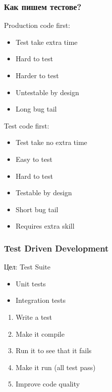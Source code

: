 
\begin{frame}
  \frametitle{Как пишем тестове?}
  \begin{minipage}[t]{0.48\linewidth}
  \pause
  Production code first:\pause
  \begin{itemize}
     \item Test take extra time\pause
     \item Hard to test\pause
     \item Harder to test\pause
     \item Untestable by design\pause
     \item Long bug tail\pause
  \end{itemize}
  \end{minipage}\hfill
  \begin{minipage}[t]{0.48\linewidth}
  Test code first:\pause
  \begin{itemize}
     \item Test take no extra time\pause
     \item Easy to test\pause
     \item Hard to test\pause
     \item Testable by design\pause
     \item Short bug tail\pause
     \item Requires extra skill
  \end{itemize}
  \end{minipage}
\end{frame}

\begin{frame}
  \frametitle{Test Driven Development}
    \begin{minipage}[t]{0.48\linewidth}
        Цел: Test Suite
        \begin{itemize}
            \item Unit tests
            \item Integration tests
        \end{itemize}
    \end{minipage}\hfill
    \begin{minipage}[t]{0.48\linewidth}
        \begin{enumerate} 
            \item Write a test
            \item Make it compile
            \item Run it to see that it fails
            \item Make it run (all test pass)
            \item Improve code quality
         \end{enumerate} 
    \end{minipage}
\end{frame}


